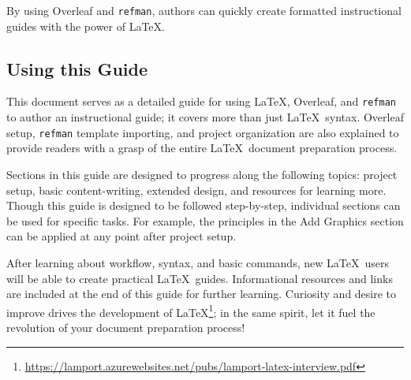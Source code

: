 By using Overleaf and \texttt{refman}, authors can quickly create formatted instructional guides with the power of \LaTeX.

\subsection{Using this Guide}
This document serves as a detailed guide for using \LaTeX, Overleaf, and \texttt{refman} to author an instructional guide; it covers more than just \LaTeX\ syntax. Overleaf setup, \texttt{refman} template importing, and project organization are also explained to provide readers with a grasp of the entire \LaTeX\ document preparation process.
\par
Sections in this guide are designed to progress along the following topics: project setup, basic content-writing, extended design, and resources for learning more. Though this guide is designed to be followed step-by-step, individual sections can be used for specific tasks. For example, the principles in the  Add Graphics section can be applied at any point after project setup.
\par
After learning about workflow, syntax, and basic commands, new \LaTeX\ users will be able to create practical \LaTeX\ guides. Informational resources and links are included at the end of this guide for further learning. Curiosity and desire to improve drives the development of \LaTeX\footnote{\url{https://lamport.azurewebsites.net/pubs/lamport-latex-interview.pdf}}; in the same spirit, let it fuel the revolution of your document preparation process!
\par

